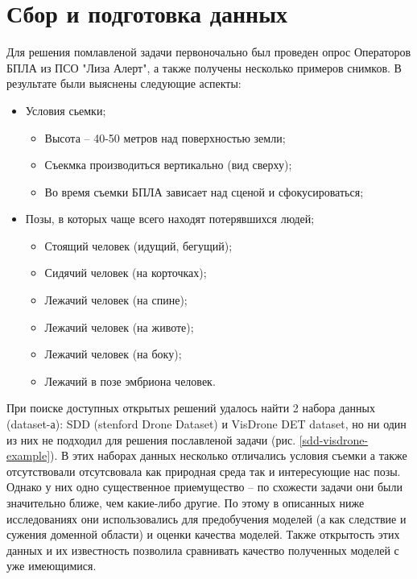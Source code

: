 \section{Сбор и подготовка данных}

Для решения помлавленой задачи первоночально был проведен опрос Операторов БПЛА из ПСО "Лиза Алерт", а также получены несколько примеров снимков. В результате были выяснены следующие аспекты:

\begin{itemize}
    \item Условия сьемки;
    \begin{itemize}
        \item Высота -- 40-50 метров над поверхностью земли;
        \item Съекмка производиться вертикально (вид сверху);
        \item Во время съемки БПЛА зависает над сценой и сфокусироваться;
    \end{itemize}
    \item Позы, в которых чаще всего находят потерявшихся людей;
    \begin{itemize}
        \item Стоящий человек (идущий, бегущий);
        \item Сидячий человек (на корточках);
        \item Лежачий человек (на спине);
        \item Лежачий человек (на животе);
        \item Лежачий человек (на боку);
        \item Лежачий в позе эмбриона человек.
    \end{itemize}
\end{itemize}

При поиске доступных открытых решений удалось найти 2 набора данных (dataset-а): SDD (stenford Drone Dataset) и VisDrone DET dataset, но ни один из них не подходил для решения пославленой задачи (рис. \ref{sdd-visdrone-example}). В этих наборах данных несколько отличались условия съемки а также отсутствовали отсутсвовала как природная среда так и интересующие нас позы. Однако у них одно существенное приемущество -- по схожести задачи они были значительно ближе, чем какие-либо другие. По этому в описанных ниже исследованиях они использовались для предобучения моделей (а как следствие и сужения доменной области) и оценки качества моделей. Также открытость этих данных и их известность позволила сравнивать качество полученных моделей с уже имеющимися.

